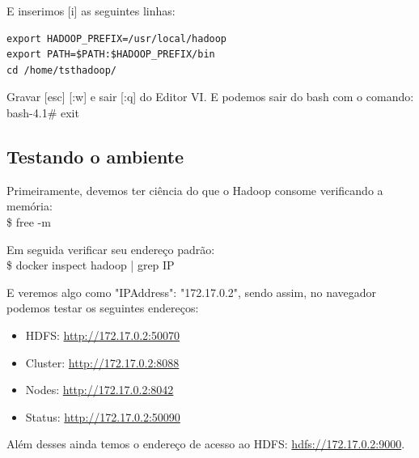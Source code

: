 \documentclass[a4paper,11pt]{article}
\begin{document}
E inserimos [i] as seguintes linhas:
\begin{lstlisting}
export HADOOP_PREFIX=/usr/local/hadoop
export PATH=$PATH:$HADOOP_PREFIX/bin
cd /home/tsthadoop/
\end{lstlisting}

Gravar [esc] [:w] e sair [:q] do Editor VI. E podemos sair do bash com o comando: \\
{\ttfamily bash-4.1\# exit}

\subsection{Testando o ambiente}
Primeiramente, devemos ter ciência do que o Hadoop consome verificando a memória: \\
{\ttfamily\$ free -m}

Em seguida verificar seu endereço padrão: \\
{\ttfamily\$ docker inspect hadoop | grep IP}

E veremos algo como "IPAddress": "172.17.0.2", sendo assim, no navegador podemos testar os seguintes endereços: \vspace{-1em}
\begin{itemize}
	\item HDFS: \url{http://172.17.0.2:50070}
	\item Cluster: \url{http://172.17.0.2:8088}
	\item Nodes: \url{http://172.17.0.2:8042}
	\item Status: \url{http://172.17.0.2:50090}
\end{itemize}
Além desses ainda temos o endereço de acesso ao HDFS: \url{hdfs://172.17.0.2:9000}.
\end{document}
